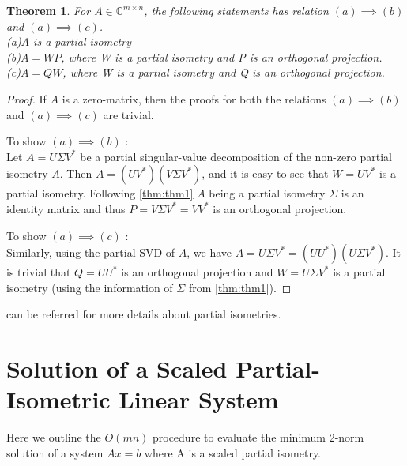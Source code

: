 \documentclass[a4paper,fleqn]{cas-sc}
\newtheorem{theorem}{Theorem}[section]      %
\theoremstyle{definition}
\theoremstyle{remark}
\begin{document}
\begin{theorem}\label{thm:thm2}
    For $A \in \mathbb{C}^{m \times n} $, the following statements has relation $(a) \implies (b)$ and $(a) \implies (c)$.\\
 (a)$A$ is a partial isometry\\
 (b)$A=WP$, where W is a partial isometry and P is an orthogonal projection.\\ 
 (c)$A=QW$, where W is a partial isometry and Q is an orthogonal projection.
\end{theorem}
\begin{proof}
    If $A$ is a zero-matrix, then the proofs for both the relations $(a) \implies (b)$ and $(a) \implies (c)$ are trivial.
    
    To show $(a) \implies (b)$ :\\
     Let $A=U \Sigma V^*$ be a partial singular-value decomposition of the non-zero partial isometry $A$. Then $A=(UV^*)(V\Sigma V^*)$, and it is easy to see that $W=UV^*$ is a partial isometry. Following \cref{thm:thm1} $A$ being a partial isometry $\Sigma$ is an identity matrix and thus $P=V\Sigma V^*=VV^*$ is an orthogonal projection.

    To show $(a) \implies (c)$ :\\
    Similarly, using the partial SVD of $A$, we have $A= U \Sigma V^* = (UU^*)(U\Sigma V^*)$. It is trivial that $Q=UU^*$ is an orthogonal projection and $W=U\Sigma V^*$ is a partial isometry (using the information of $\Sigma$ from \cref{thm:thm1}).
    \end{proof}

\cite{partialisometryarxiv, partialisometryelsiver,partialisometrynote,f1,f3,f5,f6,a1} can be referred for more details about partial isometries.

\section{Solution of a Scaled Partial-Isometric Linear System}\label{sec:methods}
Here we outline the $O(mn)$ procedure to evaluate the minimum 2-norm solution of a system $Ax=b$ where A is a scaled partial isometry.
\end{document}
